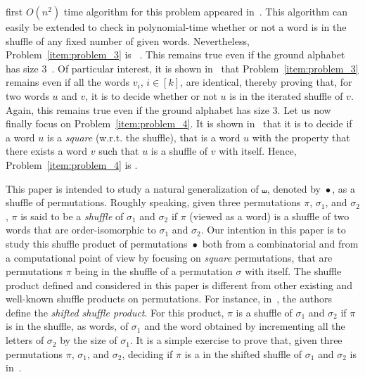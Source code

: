 \documentclass[a4paper]{llncs}
\DeclareMathOperator{\SHUFFLE}{\bullet}
\begin{document}
first $O(n^2)$ time algorithm for this problem appeared
in~\cite{Mansfield:DAM:1983}. This algorithm can easily be extended to
check in polynomial-time whether or not a word is in the shuffle of any
fixed number of given words. Nevertheless, Problem~\ref{item:problem_3}
is \NPC~\cite{Mansfield:DAM:1983,Warmuth:Haussler:JCSS:1984}. This
remains true even if the ground alphabet has size
$3$~\cite{Warmuth:Haussler:JCSS:1984}. Of particular interest,
it is shown in~\cite{Warmuth:Haussler:JCSS:1984} that
Problem~\ref{item:problem_3} remains \NPC even if all the words $v_i$,
$i \in [k]$, are identical, thereby proving that, for two words $u$ and
$v$, it is \NPC to decide whether or not $u$ is in the iterated shuffle
of $v$. Again, this remains true even if the ground alphabet has size $3$.
Let us now finally focus on Problem~\ref{item:problem_4}. It is shown
in~\cite{Buss:Soltys:2014,Rizzi:Vialette:CSR:2013} that it is \NPC to
decide if a word $u$ is a \emph{square} (w.r.t. the shuffle), that is
a word $u$ with the property that there exists a word $v$ such that $u$
is a shuffle of $v$ with itself. Hence, Problem~\ref{item:problem_4}
is \NPC.
\smallskip

This paper is intended to study a natural generalization of $\shuffle$,
denoted by $\SHUFFLE$, as a shuffle of permutations. Roughly speaking,
given three permutations $\pi$, $\sigma_1$, and $\sigma_2$, $\pi$ is
said to be a \emph{shuffle} of $\sigma_1$ and $\sigma_2$ if $\pi$ (viewed
as a word) is a shuffle of two words that are order-isomorphic to
$\sigma_1$ and $\sigma_2$. Our intention in this paper is to study this
shuffle product of permutations $\SHUFFLE$ both from a combinatorial and
from a computational point of view by focusing on \emph{square}
permutations, that are permutations $\pi$ being in the shuffle of a
permutation $\sigma$ with itself. The shuffle product defined and
considered in this paper is different from other existing and well-known
shuffle products on permutations. For instance, in~\cite{DHT:IJAC:2002},
the authors define the \emph{shifted shuffle product}. For this product,
$\pi$ is a shuffle of $\sigma_1$ and $\sigma_2$ if $\pi$ is in the
shuffle, as words, of $\sigma_1$ and the word obtained by incrementing
all the letters of $\sigma_2$ by the size of $\sigma_1$. It is a simple
exercise to prove that, given three permutations $\pi$, $\sigma_1$, and
$\sigma_2$, deciding if $\pi$ is a in the shifted shuffle of $\sigma_1$
and $\sigma_2$ is in~\Pclass.
\smallskip
\end{document}
